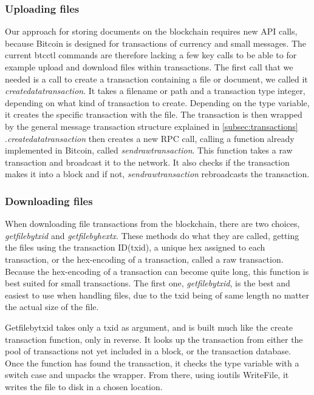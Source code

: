 \documentclass[12pt]{article}
\begin{document}
\subsubsection{Uploading files}
Our approach for storing documents on the blockchain requires new API calls, because Bitcoin is designed for transactions of currency and small messages. The current btcctl commands are therefore lacking a few key calls to be able to for example upload and download files within transactions. The first call that we needed is a call to create a transaction containing a file or document, we called it \textit{createdatatransaction}.  It takes a filename or path and a transaction type integer, depending on what kind of transaction to create. Depending on the type variable, it creates the specific transaction with the file. The transaction is then wrapped by the general message transaction structure explained in \ref{subsec:transactions} .\textit{createdatatransaction} then creates a new RPC call, calling a function already implemented in Bitcoin, called \textit{sendrawtransaction}. This function takes a raw transaction and broadcast it to the network. It also checks if the transaction makes it into a block and if not, \textit{sendrawtransaction} rebroadcasts the transaction. 

\subsubsection{Downloading files}
When downloading file transactions from the blockchain, there are two choices, \textit{getfilebytxid} and \textit{getfilebyhextx}. These methods do what they are called, getting the files using the transaction ID(txid), a unique hex assigned to each transaction, or the hex-encoding of a transaction, called a raw transaction.  Because the hex-encoding of a transaction can become quite long, this function is best suited for small transactions. The first one, \textit{getfilebytxid}, is the best and easiest to use when handling files, due to the txid being of same length no matter the actual size of the file. 

Getfilebytxid takes only a txid as argument, and is built much like the create transaction function, only in reverse. It looks up the transaction from either the pool of transactions not yet included in a block, or the transaction database. Once the function has found the transaction, it checks the type variable with a switch case and unpacks the wrapper. From there, using ioutils WriteFile, it writes the file to disk in a chosen location. 
\end{document}
